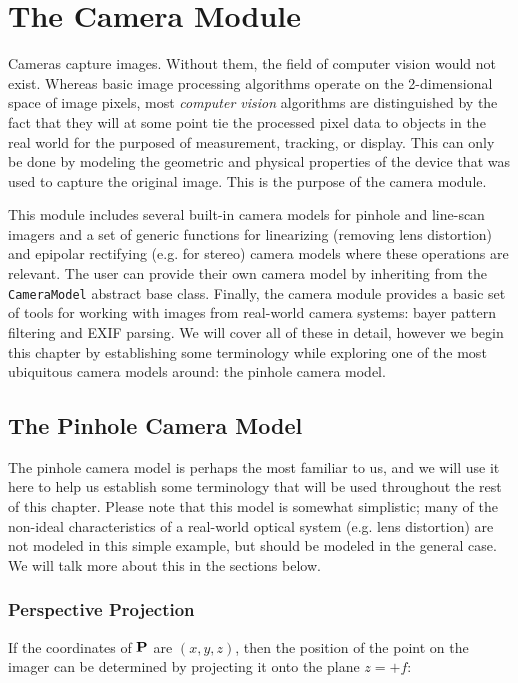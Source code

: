 \chapter{The Camera Module}

Cameras capture images.  Without them, the field of computer vision would not exist.  Whereas basic image processing algorithms operate on the 2-dimensional space of image pixels, most {\em computer vision} algorithms are distinguished by the fact that they will at some point tie the processed pixel data to objects in the real world for the purposed of measurement, tracking, or display.  This can only be done by modeling the geometric and physical properties of the device that was used to capture the original image.  This is the purpose of the camera module.

This module includes several built-in camera models for pinhole and line-scan imagers and a set of generic functions for linearizing (removing lens distortion) and epipolar rectifying (e.g. for stereo) camera models where these operations are relevant.  The user can provide their own camera model by inheriting from the {\tt CameraModel} abstract base class. Finally, the camera module provides a basic set of tools for working with images from real-world camera systems: bayer pattern filtering and EXIF parsing.  We will cover all of these in detail, however we begin this chapter by establishing some terminology while exploring one of the most ubiquitous camera models around: the pinhole camera model. 

\section{The Pinhole Camera Model}
The pinhole camera model is perhaps the most familiar to us, and we will use it here to help us establish some terminology that will be used throughout the rest of this chapter.  Please note that this model is somewhat simplistic; many of the non-ideal characteristics of a real-world optical system (e.g. lens distortion) are not modeled in this simple example, but should be modeled in the general case.  We will talk more about this in the sections below.

\subsection{Perspective Projection}

If the coordinates of ${\bf P}$ are $(x,y,z)$, then the position of the point on the imager can be determined by projecting it onto the plane $ z = +f$:

